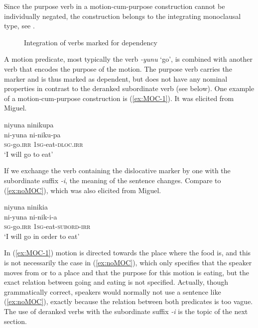 \sloppy
Since the purpose verb in a motion-cum-purpose construction cannot be  individually negated, the construction belongs to the integrating monoclausal type, see .
\fussy

\begin{figure}
\centering
{}
\caption{Integration of verbs marked for dependency}
\label{fig:IntegrationScaleMCPC}
\end{figure}

A motion predicate, most typically the verb \textit{-yunu} ‘go’, is combined with another verb that encodes the purpose of the motion. The purpose verb carries the  marker and is thus marked as dependent, but does not have any nominal properties in contrast to the deranked subordinate verb (see  below). One example of a motion-cum-purpose construction is (\ref{ex:MOC-1}). It was elicited from Miguel.

\ea\label{ex:MOC-1}
\begingl
\glpreamble niyuna ninikupa\\
\gla ni-yuna ni-niku-pa\\
\textsc{sg}-go.\textsc{irr} 1\textsc{sg}-eat-\textsc{dloc.irr}\\
\glft ‘I will go to eat’
\endgl
\trailingcitation{[mxx-e160811sd.174]}
\xe
{}

If we exchange the verb containing the dislocative marker by one with the subordinate suffix \textit{-i}, the meaning of the sentence changes. Compare to (\ref{ex:noMOC}), which was also elicited from Miguel.

\ea\label{ex:noMOC}
\begingl
\glpreamble niyuna ninikia\\
\gla ni-yuna ni-nik-i-a\\
\textsc{sg}-go.\textsc{irr} 1\textsc{sg}-eat-\textsc{subord}-\textsc{irr}\\
\glft ‘I will go in order to eat’
\endgl
\trailingcitation{[mxx-e160811sd.176-177]}
\xe

In (\ref{ex:MOC-1}) motion is directed towards the place where the food is, and this is not necessarily the case in (\ref{ex:noMOC}), which only specifies that the speaker moves from or to a place and that the purpose for this motion is eating, but the exact relation between going and eating is not specified. Actually, though grammatically correct, speakers would normally not use a sentence like (\ref{ex:noMOC}), exactly because the relation between both predicates is too vague. The use of deranked verbs with the subordinate suffix \textit{-i} is the topic of the next section.

